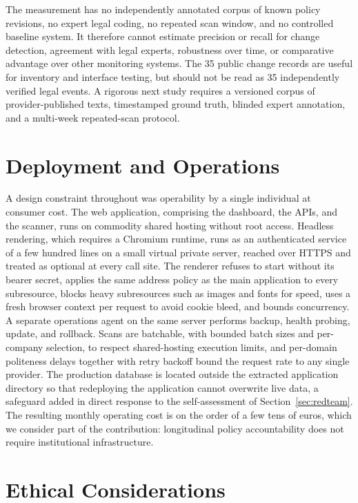 \documentclass[11pt]{article}
\begin{document}
The measurement has no independently annotated corpus of known policy revisions,
no expert legal coding, no repeated scan window, and no controlled baseline
system. It therefore cannot estimate precision or recall for change detection,
agreement with legal experts, robustness over time, or comparative advantage over
other monitoring systems. The 35 public change records are useful for inventory and interface
testing, but should not be read as 35 independently verified legal events. A
rigorous next study requires a versioned corpus of provider-published
texts, timestamped ground truth, blinded expert annotation, and a multi-week
repeated-scan protocol.

\section{Deployment and Operations}
\label{sec:deployment}

A design constraint throughout was operability by a single individual at consumer
cost. The web application, comprising the dashboard, the APIs, and the scanner,
runs on commodity shared hosting without root access. Headless rendering, which
requires a Chromium runtime, runs as an authenticated service of a few hundred
lines on a small virtual private server, reached over HTTPS and treated as
optional at every call site. The renderer refuses to start without its bearer
secret, applies the same address policy as the main application to every
subresource, blocks heavy subresources such as images and fonts for speed, uses a
fresh browser context per request to avoid cookie bleed, and bounds concurrency.
A separate operations agent on the same server performs backup, health probing,
update, and rollback. Scans are batchable, with bounded batch sizes and
per-company selection, to respect shared-hosting execution limits, and per-domain
politeness delays together with retry backoff bound the request rate to any
single provider. The production database is located outside the extracted
application directory so that redeploying the application cannot overwrite live
data, a safeguard added in direct response to the self-assessment of
Section~\ref{sec:redteam}. The resulting monthly operating cost is on the order of
a few tens of euros, which we consider part of the contribution: longitudinal
policy accountability does not require institutional infrastructure.

\section{Ethical Considerations}
\label{sec:ethics}
\end{document}
